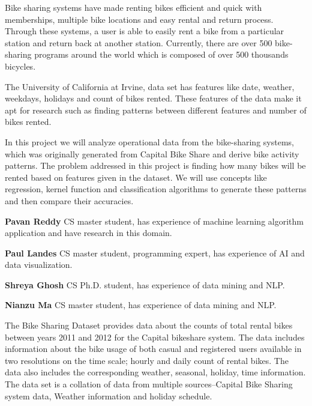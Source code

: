 \documentclass[12pt]{article}
\author{\theauthor}
\newcommand{\ci}[1]{\cite{#1}}
\begin{document}
\maketitle



Bike sharing systems have made renting bikes efficient and quick with
memberships, multiple bike locations and easy rental and return
process. Through these systems, a user is able to easily rent a bike from a
particular station and return back at another station. Currently, there are
over 500 bike-sharing programs around the world which is composed of over 500
thousands bicycles\ci{ucibikeshare}.


The University of California at Irvine, data set has features like date,
weather, weekdays, holidays and count of bikes rented. These features of the
data make it apt for research such as finding patterns between different
features and number of bikes rented.

In this project we will analyze operational data from the bike-sharing systems,
which was originally generated from Capital Bike Share and derive bike activity
patterns. The problem addressed in this project is finding how many bikes will
be rented based on features given in the dataset. We will use concepts like
regression, kernel function and classification algorithms to generate these
patterns and then compare their accuracies.

{\bf Pavan Reddy} CS master student, has experience of machine learning
algorithm application and have research in this domain.

\noindent
{\bf Paul Landes} CS master student, programming expert, has experience of AI
and data visualization.

\noindent
{\bf Shreya Ghosh} CS Ph.D. student, has experience of data mining and NLP.

\noindent
{\bf Nianzu Ma} CS master student, has experience of data mining and NLP.



The Bike Sharing Dataset provides data about the counts of total rental bikes
between years 2011 and 2012 for the Capital bikeshare system. The data includes
information about the bike usage of both casual and registered users available
in two resolutions on the time scale; hourly and daily count of rental
bikes. The data also includes the corresponding weather, seasonal, holiday,
time information. The data set is a collation of data from multiple
sources--Capital Bike Sharing system data\ci{capbikeshare}, Weather
information\ci{freemeteo} and holiday schedule\ci{holiday}.
\end{document}
